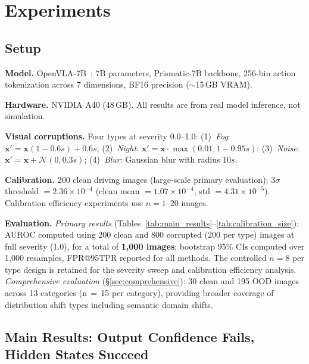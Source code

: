 \documentclass[11pt]{article}
\newcommand{\bx}{\mathbf{x}}
\begin{document}
\section{Experiments}
\label{sec:experiments}

\subsection{Setup}

\textbf{Model.}
OpenVLA-7B~\cite{kim2024openvla}: 7B parameters, Prismatic-7B backbone, 256-bin action tokenization across 7 dimensions, BF16 precision ($\sim$15\,GB VRAM).

\textbf{Hardware.}
NVIDIA A40 (48\,GB).
All results are from real model inference, not simulation.

\textbf{Visual corruptions.}
Four types at severity 0.0--1.0:
(1)~\textit{Fog}: $\bx' = \bx(1 - 0.6s) + 0.6s$;
(2)~\textit{Night}: $\bx' = \bx \cdot \max(0.01, 1 - 0.95s)$;
(3)~\textit{Noise}: $\bx' = \bx + \mathcal{N}(0, 0.3s)$;
(4)~\textit{Blur}: Gaussian blur with radius $10s$.

\textbf{Calibration.}
200 clean driving images (large-scale primary evaluation); $3\sigma$ threshold $= 2.36 \times 10^{-4}$ (clean mean $= 1.07 \times 10^{-4}$, std $= 4.31 \times 10^{-5}$). Calibration efficiency experiments use $n = 1$--$20$ images.

\textbf{Evaluation.}
\emph{Primary results} (Tables~\ref{tab:main_results}--\ref{tab:calibration_size}): AUROC computed using 200 clean and 800 corrupted (200 per type) images at full severity (1.0), for a total of \textbf{1,000 images}; bootstrap 95\% CIs computed over 1,000 resamples, FPR@95TPR reported for all methods.
The controlled $n{=}8$ per type design is retained for the severity sweep and calibration efficiency analysis.
\emph{Comprehensive evaluation} (\S\ref{sec:comprehensive}): 30 clean and 195 OOD images across 13 categories (n\,$=$\,15 per category), providing broader coverage of distribution shift types including semantic domain shifts.

\subsection{Main Results: Output Confidence Fails, Hidden States Succeed}
\label{sec:main_results}
\end{document}
